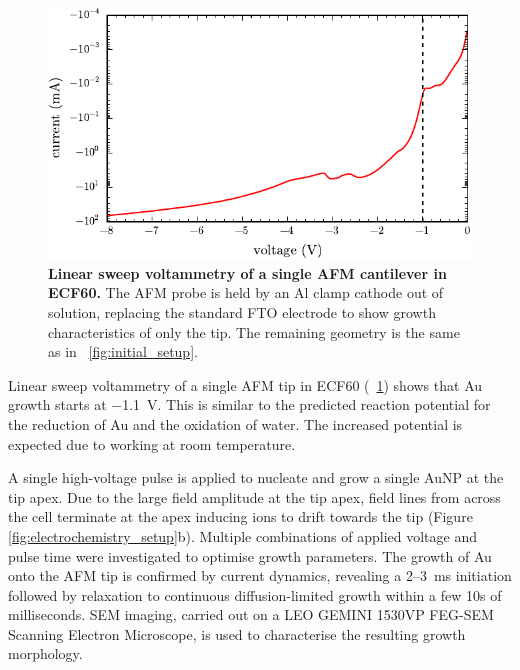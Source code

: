 \documentclass{article}
\begin{document}
\begin{figure}[bt]
\centering
\includegraphics{figures/initial_cv}
\caption[Linear sweep voltammetry of a single AFM cantilever in ECF60]{\textbf{Linear sweep voltammetry of a single AFM cantilever in ECF60.} The AFM probe is held by an Al clamp cathode out of solution, replacing the standard FTO electrode to show growth characteristics of only the tip. The remaining geometry is the same as in \figurename~\ref{fig:initial_setup}.}
\label{fig:initial_cv}
\end{figure}

Linear sweep voltammetry of a single AFM tip in ECF60 (\figurename~\ref{fig:initial_cv}) shows that Au growth starts at \SI{-1.1}{V}. This is similar to the predicted reaction potential for the reduction of Au and the oxidation of water. The increased potential is expected due to working at room temperature. %

A single high-voltage pulse is applied to nucleate and grow a single AuNP at the tip apex. Due to the large field amplitude at the tip apex, field lines from across the cell terminate at the apex inducing ions to drift towards the tip (Figure \ref{fig:electrochemistry_setup}b).  Multiple combinations of applied voltage and pulse time were investigated to optimise growth parameters. The growth of Au onto the AFM tip is confirmed by current dynamics, revealing a 2--\SI{3}{ms} initiation followed by relaxation to continuous diffusion-limited growth within a few 10s of milliseconds. SEM imaging, carried out on a LEO GEMINI 1530VP FEG-SEM Scanning Electron Microscope, is used to characterise the resulting growth morphology.
\end{document}
